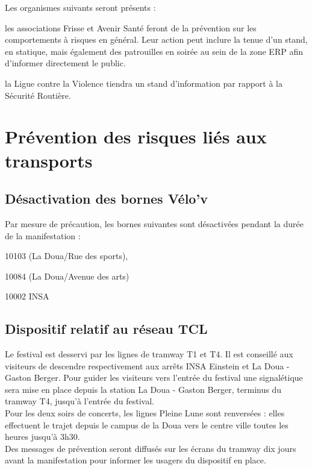 \documentclass[hidelinks, paper=a4, fontsize=13pt]{report}
\begin{document}
Les organismes suivants seront présents :
\begin{list}{•}{}
\item les associations Frisse et Avenir Santé feront de la prévention sur les comportements à risques en général. Leur action peut inclure la tenue d’un stand, en statique, mais également des patrouilles en soirée au sein de la zone ERP afin d'informer directement le public.
\item la Ligue contre la Violence tiendra un stand d’information par rapport à la Sécurité Routière.
\end{list}

\section{Prévention des risques liés aux transports}

\subsection{Désactivation des bornes Vélo’v}

Par mesure de précaution, les bornes suivantes sont désactivées pendant la durée de la manifestation : 
\begin{list}{•}{}
\item 10103 (La Doua/Rue des sports), 
\item 10084 (La Doua/Avenue des arts) 
\item 10002 INSA  
\end{list}

\subsection{Dispositif relatif au réseau TCL}


Le festival est desservi par les lignes de tramway T1 et T4. Il est conseillé aux visiteurs de descendre respectivement aux arrêts INSA Einstein et La Doua - Gaston Berger. Pour guider les visiteurs vers l’entrée du festival une signalétique sera mise en place depuis la station La Doua - Gaston Berger, terminus du tramway T4, jusqu’à l’entrée du festival.\\

Pour les deux soirs de concerts, les lignes Pleine Lune sont renversées : elles effectuent le trajet depuis le campus de la Doua vers le centre ville toutes les heures jusqu’à 3h30.\\

Des messages de prévention seront diffusés sur les écrans du tramway dix jours avant la manifestation pour informer  les usagers du dispositif en place.
\end{document}

